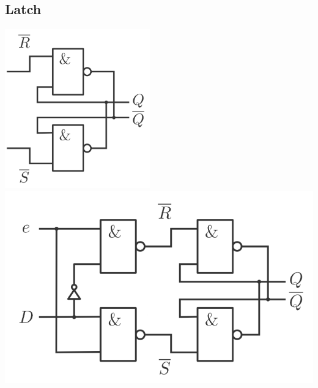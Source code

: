 \documentclass[6pt,a4paper]{scrartcl}
\begin{document}
\begin{multicols*}{3}
	\subsection{Latch}
	\begin{minipage}{0.35\linewidth}
		\includegraphics[width=\linewidth]{img/logic/rs-latch}
		\includegraphics[width=\linewidth]{img/logic/enable-latch}
	\end{minipage}\hspace{5pt}
	\begin{minipage}{0.48\linewidth}

\end{minipage}
\end{multicols*}
\end{document}

